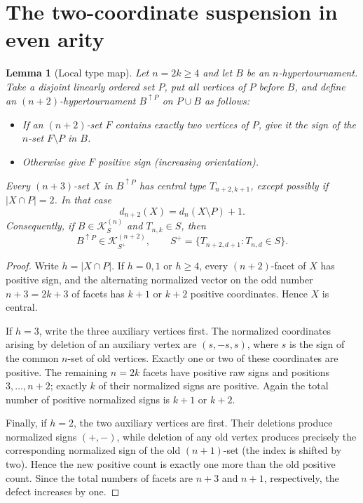 \documentclass[11pt,a4paper]{article}
\newtheorem{lemma}[theorem]{Lemma}
\theoremstyle{remark}
\newcommand{\K}{\mathcal K}
\begin{document}
\section{The two-coordinate suspension in even arity}\label{sec:even-lift}
\begin{lemma}[Local type map]\label{lem:even-types}
Let $n=2k\ge4$ and let $B$ be an $n$-hypertournament.  Take a disjoint
linearly ordered set $P$, put all vertices of $P$ before $B$, and define an
$(n+2)$-hypertournament $B^{\uparrow P}$ on $P\cup B$ as follows:
\begin{itemize}
\item If an $(n+2)$-set $F$ contains exactly two vertices of $P$, give
  it the sign of the $n$-set $F\setminus P$ in $B$.
\item Otherwise give $F$ positive sign (increasing orientation).
\end{itemize}
Every $(n+3)$-set $X$ in $B^{\uparrow P}$ has central type
$T_{n+2,k+1}$, except possibly if $|X\cap P|=2$.  In that case
\[
  d_{n+2}(X)=d_n(X\setminus P)+1.
\]
Consequently, if $B\in\K^{(n)}_S$ and $T_{n,k}\in S$, then
\[
 B^{\uparrow P}\in\K^{(n+2)}_{S^+},\qquad
 S^+=\{T_{n+2,d+1}:T_{n,d}\in S\}.
\]
\end{lemma}
\begin{proof}
Write $h=|X\cap P|$.  If $h=0,1$ or $h\ge4$, every $(n+2)$-facet
of $X$ has positive sign, and the alternating normalized vector on the
odd number $n+3=2k+3$ of facets has $k+1$ or $k+2$ positive coordinates.
Hence $X$ is central.

If $h=3$, write the three auxiliary vertices first.  The normalized
coordinates arising by deletion of an auxiliary vertex are
$(s,-s,s)$, where $s$ is the sign of the common $n$-set of old vertices.
Exactly one or two of these coordinates are positive.  The remaining
$n=2k$ facets have positive raw signs and positions $3,\ldots,n+2$;
exactly $k$ of their normalized signs are positive.  Again the total
number of positive normalized signs is $k+1$ or $k+2$.

Finally, if $h=2$, the two auxiliary vertices are first.  Their
deletions produce normalized signs $(+,-)$, while deletion of any old
vertex produces precisely the corresponding normalized sign of the
old $(n+1)$-set (the index is shifted by two).  Hence the new positive
count is exactly one more than the old positive count.  Since the total
numbers of facets are $n+3$ and $n+1$, respectively, the defect increases
by one.
\end{proof}
\end{document}
